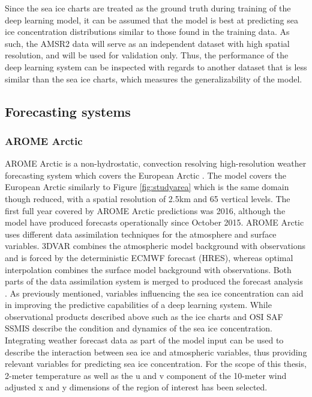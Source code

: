 \documentclass[../main/thesis.tex]{subfiles}
\begin{document}
Since the sea ice charts are treated as the ground truth during training of the deep learning model, it can be assumed that the model is best at predicting sea ice concentration distributions similar to those found in the training data. As such, the AMSR2 data will serve as an independent dataset with high spatial resolution, and will be used for validation only. Thus, the performance of the deep learning system can be inspected with regards to another dataset that is less similar than the sea ice charts, which measures the generalizability of the model.

\subsection{Forecasting systems} 
\subsubsection{AROME Arctic}
\label{sec:arome}
AROME Arctic is a non-hydrostatic, convection resolving high-resolution weather forecasting system which covers the European Arctic \citep{Mueller2017}. The model covers the European Arctic similarly to Figure \ref{fig:studyarea} which is the same domain though reduced, with a spatial resolution of 2.5km and 65 vertical levels. The first full year covered by AROME Arctic predictions was 2016, although the model have produced forecasts operationally since October 2015. AROME Arctic uses different data assimilation techniques for the atmosphere and surface variables. 3DVAR combines the atmospheric model background with observations and is forced by the deterministic ECMWF forecast (HRES), whereas optimal interpolation combines the surface model background with observations. Both parts of the data assimilation system is merged to produced the forecast analysis \citep{Mueller2017}. As previously mentioned, variables influencing the sea ice concentration can aid in improving the predictive capabilities of a deep learning system. While observational products described above such as the ice charts \citep{Dinessen2020} and OSI SAF SSMIS \citep{Tonboe2017} describe the condition and dynamics of the sea ice concentration. Integrating weather forecast data as part of the model input can be used to describe the interaction between sea ice and atmospheric variables, thus providing relevant variables for predicting sea ice concentration. For the scope of this thesis, 2-meter temperature as well as the u and v component of the 10-meter wind adjusted x and y dimensions of the region of interest has been selected.
\end{document}
